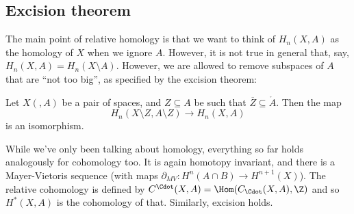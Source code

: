 \documentclass[a4paper]{article}
\begin{document}
\subsection{Excision theorem}
The main point of relative homology is that we want to think of $H_n(X, A)$ as the homology of $X$ when we ignore $A$. However, it is not true in general that, say, $H_n(X, A) = H_n(X \setminus A)$. However, we are allowed to remove subspaces of $A$ that are ``not too big'', as specified by the excision theorem:

\begin{thm}
  Let $X(, A)$ be a pair of spaces, and $Z \subseteq A$ be such that $\overline{Z} \subseteq \mathring{A}$. Then the map
  \[
    H_n(X \setminus Z, A \setminus Z) \to H_n(X, A)
  \]
  is an isomorphism.
\end{thm}

While we've only been talking about homology, everything so far holds analogously for cohomology too. It is again homotopy invariant, and there is a Mayer-Vietoris sequence (with maps $\partial_{MV}: H^n(A \cap B) \to H^{n + 1}(X)$). The relative cohomology is defined by $C^{\Cdot}(X, A) = \Hom(C_{\Cdot}(X, A), \Z)$ and so $H^*(X, A)$ is the cohomology of that. Similarly, excision holds.
\end{document}

